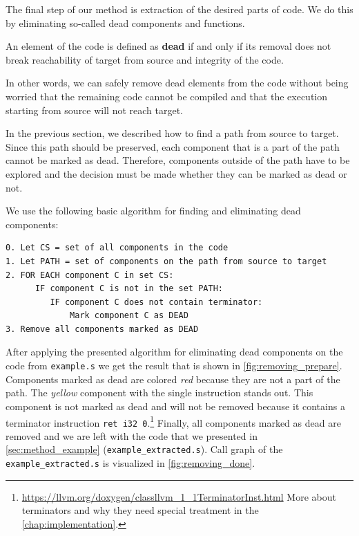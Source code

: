 \documentclass[12pt, twoside]{fithesis2}
\renewcommand{\_}{\leavevmode \kern0.07em\vbox{\hrule width0.4em}}
\begin{document}
The final step of our method is extraction of the desired parts of code.
We do this by eliminating so-called dead components and functions.

An element of the code is defined as \textbf{dead} if and only if its removal
does not break reachability of target from source and integrity of the code.

In other words, we can safely remove dead elements from the code without being
worried that the remaining code cannot be compiled and that the execution
starting from source will not reach target.

In the previous section, we described how to find a path from source to target.
Since this path should be preserved, each component that is a part of the path
cannot be marked as dead.
Therefore, components outside of the path have to be explored and the decision
must be made whether they can be marked as dead or not.

We  use the following basic algorithm for finding and eliminating dead
components:

\begin{verbatim}
0. Let CS = set of all components in the code
1. Let PATH = set of components on the path from source to target
2. FOR EACH component C in set CS:
      IF component C is not in the set PATH:
         IF component C does not contain terminator:
             Mark component C as DEAD
3. Remove all components marked as DEAD
\end{verbatim}


After applying the presented algorithm for eliminating dead components on the
code from \texttt{example.s} we get the result that is shown
in \autoref{fig:removing_prepare}.
Components marked as dead are colored \emph{red} because they are not
a part of the path.
The \emph{yellow} component with the single instruction stands out.
This component is not marked as dead and will not be removed because it contains
a terminator instruction \texttt{ret i32 0}.\footnote{
\url{https://llvm.org/doxygen/classllvm_1_1TerminatorInst.html}
More about terminators and why they need special treatment in the
\autoref{chap:implementation}.
}
Finally, all components marked as dead are removed and we are left with the
code that we presented in \autoref{sec:method_example}
(\texttt{example_extracted.s}).
Call graph of the \texttt{example_extracted.s} is visualized in
\autoref{fig:removing_done}.
\end{document}
